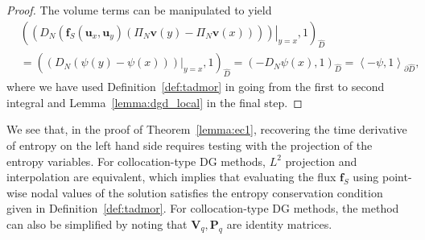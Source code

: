 \documentclass[preprint,10pt]{article}
\theoremstyle{definition}
\theoremstyle{lemma}
\theoremstyle{theorem}
\theoremstyle{assumption}
\newcommand{\LRp}[1]{\left( #1 \right)}
\newcommand{\LRa}[1]{\left\langle #1 \right\rangle}
\begin{document}
\begin{proof}
The volume terms can be manipulated to yield
\begin{align*}
&\LRp{\left.\LRp{D_N \LRp{\bm{f}_S(\bm{u}_x,\bm{u}_y)\LRp{\Pi_N\bm{v}(y)-\Pi_N\bm{v}(x)} }}\right|_{y=x},1}_{\widehat{D}} \\
&= \LRp{ \left.\LRp{D_N\LRp{\psi(y)-\psi(x) }}\right|_{y=x},1}_{\widehat{D}} = \LRp{-D_N \psi(x),1}_{\widehat{D}} = \LRa{-\psi,1}_{\partial \widehat{D}},
\end{align*}
where we have used Definition~\ref{def:tadmor} in going from the first to second integral and Lemma~\ref{lemma:dgd_local} in the final step.  
%
\end{proof}

We see that, in the proof of Theorem~\ref{lemma:ec1}, recovering the time derivative of entropy on the left hand side requires testing with the projection of the entropy variables.  For collocation-type DG methods, $L^2$ projection and interpolation are equivalent, which implies that evaluating the flux $\bm{f}_S$ using point-wise nodal values of the solution satisfies the entropy conservation condition given in Definition~\ref{def:tadmor}.  For collocation-type DG methods, the method can also be simplified by noting that $\bm{V}_q,\bm{P}_q$ are identity matrices.  
\end{document}
